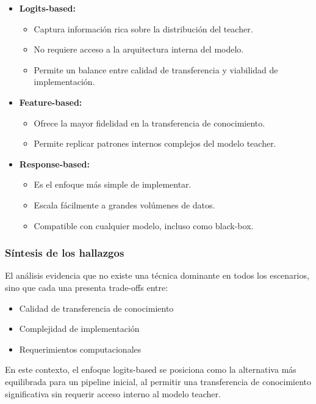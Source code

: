 \documentclass[12pt]{article}
\begin{document}
	\begin{itemize}
		\item \textbf{Logits-based:}
		\begin{itemize}
			\item Captura información rica sobre la distribución del teacher.
			\item No requiere acceso a la arquitectura interna del modelo.
			\item Permite un balance entre calidad de transferencia y viabilidad de implementación.
		\end{itemize}
		
		\item \textbf{Feature-based:}
		\begin{itemize}
			\item Ofrece la mayor fidelidad en la transferencia de conocimiento.
			\item Permite replicar patrones internos complejos del modelo teacher.
		\end{itemize}
		
		\item \textbf{Response-based:}
		\begin{itemize}
			\item Es el enfoque más simple de implementar.
			\item Escala fácilmente a grandes volúmenes de datos.
			\item Compatible con cualquier modelo, incluso como black-box.
		\end{itemize}
	\end{itemize}
	
	\subsubsection{Síntesis de los hallazgos}
	
	El análisis evidencia que no existe una técnica dominante en todos los escenarios, sino que cada una presenta trade-offs entre:
	
	\begin{itemize}
		\item Calidad de transferencia de conocimiento
		\item Complejidad de implementación
		\item Requerimientos computacionales
	\end{itemize}
	
	En este contexto, el enfoque logits-based se posiciona como la alternativa más equilibrada para un pipeline inicial, al permitir una transferencia de conocimiento significativa sin requerir acceso interno al modelo teacher.
	
\end{document}
